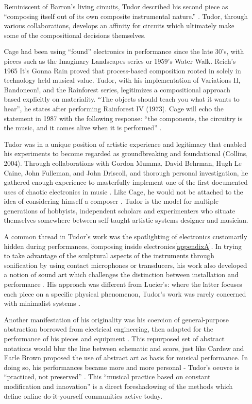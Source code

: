 Reminiscent of Barron’s living circuits, Tudor described his second piece as “composing itself out of its own composite instrumental nature.”  \cite{tudor,kuivila2004}. Tudor, through various collaborations, develops an affinity for circuits which ultimately make some of the compositional decisions themselves. 

Cage had been using “found” electronics in performance since the late 30’s, with pieces such as the Imaginary Landscapes series or 1959’s Water Walk. Reich’s 1965 It’s Gonna Rain proved that process-based composition rooted in solely in technology held musical value. Tudor, with his implementation of Variations II, Bandoneon!, and the Rainforest series, legitimizes a compositional approach based explicitly on materiality. “The objects should teach you what it wants to hear”, he states after performing Rainforest IV (1973). Cage will echo the statement in 1987 with the following response: “the components, the circuitry is the music, and it comes alive when it is performed” \cite{nakai2014}. 

Tudor was in a unique position of artistic experience and legitimacy that enabled his experiments to become regarded as groundbreaking and foundational (Collins, 2004). Through collaborations with Gordon Mumma, David Behrman, Hugh Le Caine, John Fulleman, and John Driscoll, and thorough personal investigation, he gathered enough experience to masterfully implement one of the first documented uses of chaotic electronics in music \cite{kuivila2004}.  Like Cage, he would not be attached to the idea of considering himself a composer \cite{kuivila1998}. Tudor is the model for multiple generations of hobbyists, independent scholars and experimenters who situate themselves somewhere between self-taught artistic systems designer and musician. 

A common thread in Tudor’s work was the spotlighting of electronics customarily hidden during performances, \"composing inside electronics\" \ref{appendixA}. In trying to take advantage of the sculptural aspects of the instruments through sonification by using contact microphones or transducers, his work also developed a notion of sound art which challenges the distinction between installation and performance \cite{driscoll2004}. His approach was different from Lucier’s: where the latter focuses each piece on a specific physical phenomenon, Tudor’s work was rarely concerned with minimalist systems \cite{collins2004,driscoll2004}. 

Another manifestation of his originality was his coercion of general-purpose abstraction borrowed from electrical engineering, then adapted for the performance of his pieces and equipment \cite{kuivila2004}. This repurposed set of abstract notations would blur the line between schematic and score, just like Cardew and Earle Brown proposed the use of abstract art as basis for musical performance. In doing so, his performances became more and more personal - Tudor’s oeuvre is “practiced, not preserved” \cite{kuivila1998}. This “musical practice based on constant modification and innovation” \cite{driscoll2004} is a direct foreshadowing of the methods which define online do-it-yourself communities active today. 

